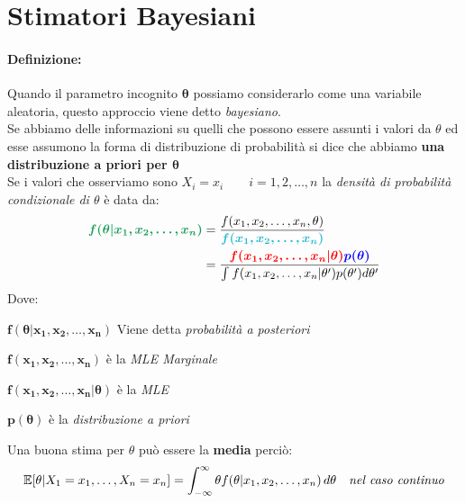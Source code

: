 \documentclass[]{article}
\makeatletter
\def\mathcolor#1#{\@mathcolor{#1}}
\def\@mathcolor#1#2#3{%
  \protect\leavevmode
  \begingroup
    \color#1{#2}#3%
  \endgroup
}
\newcommand{\ev}{\mathbb{E}[X]}
\renewcommand{\ev}[1]{\mathbb{E}[#1]}
\newcommand{\definizione}{\paragraph{Definizione:}}
\makeatother
\begin{document}
    \section{Stimatori Bayesiani}
    \definizione Quando il parametro incognito $\boldsymbol{\theta}$ possiamo considerarlo come una variabile aleatoria, questo approccio viene detto \textit{bayesiano}. \\
    Se abbiamo delle informazioni su quelli che possono essere assunti i valori da $\theta$ ed esse assumono la forma di distribuzione di probabilità si dice che abbiamo \textbf{una distribuzione a priori per $\boldsymbol{\theta}$} \\[2ex]
    Se i valori che osserviamo sono $X_i = x_i \qquad i=1,2, \ldots, n$ la \textit{densità di probabilità condizionale di $\theta$} è data da:
    \begin{equation*}
        \begin{split}
            \mathcolor{ForestGreen}{\boldsymbol{f(\theta \rvert x_1, x_2, \ldots, x_n)}} &= \frac{f(x_1, x_2, \ldots, x_n, \theta)}{\mathcolor{Turquoise}{\boldsymbol{f(x_1, x_2, \ldots, x_n)}}} \\
            &= \frac{\mathcolor{red}{\boldsymbol{f(x_1, x_2, \ldots, x_n \rvert \theta)}} \mathcolor{blue}{\boldsymbol{p(\theta)}}}{\int_{}^{} f(x_1, x_2, \ldots, x_n \rvert \theta') p(\theta') d\theta'}
        \end{split}
    \end{equation*}
    Dove:
    \begin{itemize}
        {\color{ForestGreen} \item $\boldsymbol{f(\theta \rvert x_1, x_2, \ldots, x_n)}$ Viene detta \textit{probabilità a posteriori}}
        {\color{Turquoise} \item $\boldsymbol{f(x_1, x_2, \ldots, x_n)}$ è la \textit{MLE Marginale}}
        {\color{red} \item $\boldsymbol{f(x_1, x_2, \ldots, x_n \rvert \theta)}$ è la \textit{MLE}}
        {\color{blue} \item $\boldsymbol{p(\theta)}$ è la \textit{distribuzione a priori}}
    \end{itemize}
    Una buona stima per $\theta$ può essere la \textbf{media} perciò:
    \[ \ev{\theta \rvert X_1 = x_1, \ldots, X_n = x_n} = \int_{-\infty}^{\infty} \theta f(\theta \rvert x_1, x_2, \ldots, x_n) \, d\theta \quad \text{\textit{nel caso continuo}} \]
\end{document}
